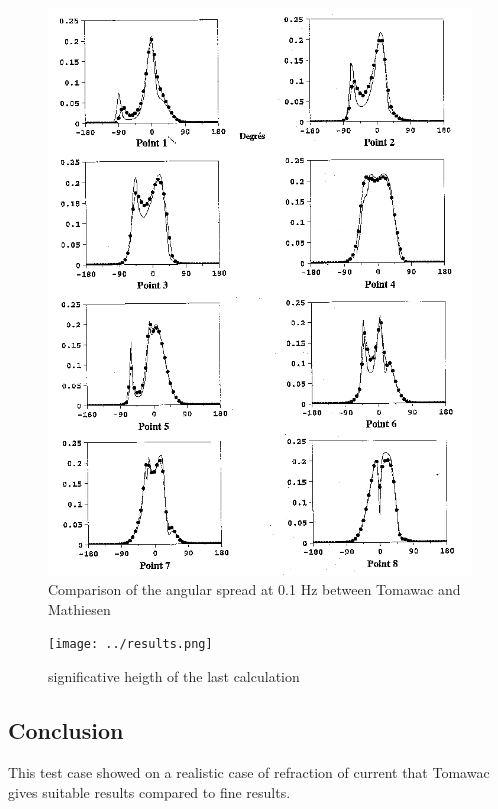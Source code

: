 \begin{figure} [!h]
\centering
\includegraphics[scale=0.55]{repartangulaire.png}
 \caption{Comparison of the angular spread at 0.1 Hz between Tomawac and Mathiesen}
\label{repartang}
\end{figure}

\begin{figure} [!h]
\centering
\texttt{[image: ../results.png]}
 \caption{significative heigth of the last calculation}
\label{measurepts}
\end{figure}

\subsection{Conclusion}
This test case showed on a realistic case of refraction of current that Tomawac
gives suitable results compared to fine results.
